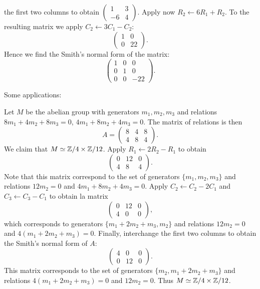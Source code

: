 \begin{example}
the first two columns to obtain 
$\begin{pmatrix}1&3\\-6&4\end{pmatrix}$. Apply now 
$R_2\leftarrow 6R_1+R_2$. To the resulting matrix we apply
$C_2\leftarrow 3C_1-C_2$:
\[
\begin{pmatrix}
    1 & 0\\
    0 & 22
\end{pmatrix}.
\]
Hence we find the Smith's normal form of the matrix: 
\[
\begin{pmatrix}
	1 & 0 & 0\\
	0 & 1 & 0\\
	0 & 0 & -22	
\end{pmatrix}.
\]
\end{example}

Some applications:

\begin{example}
Let $M$ be the abelian group with generators $m_1,m_2,m_3$ and relations 
$8m_1+4m_2+8m_3=0$, $4m_1+8m_2+4m_3=0$. The matrix of relations is then 
\[
A=\begin{pmatrix}
8 & 4 & 8\\
4 & 8 & 4
\end{pmatrix}.
\]	
We claim that $M\simeq\mathbb{Z}/4\times\mathbb{Z}/{12}$. Apply 
$R_1\leftarrow 2R_2-R_1$ to obtain 
\[
\begin{pmatrix}
0 & 12 & 0\\
4 & 8 & 4	
\end{pmatrix}. 
\]
Note that this matrix correspond to the set of generators 
$\{m_1,m_2,m_3\}$ and relations $12m_2=0$ and $4m_1+8m_2+4m_3=0$.
Apply $C_2\leftarrow C_2-2C_1$ and $C_3\leftarrow C_3-C_1$ to obtain 
la matrix
\[
\begin{pmatrix}
0 & 12 & 0\\
4 & 0 & 0	
\end{pmatrix},
\]
which corresponds to generators $\{m_1+2m_2+m_3,m_2\}$ 
and relations $12m_2=0$ and $4(m_1+2m_2+m_3)=0$. 
Finally, interchange the first two columns to obtain
the Smith's normal form of $A$: 
\[
\begin{pmatrix}
4 & 0 & 0\\
0 & 12 & 0	
\end{pmatrix}.
\]
This matrix corresponds to 
the set of generators $\{m_2,m_1+2m_2+m_3\}$ and relations $4(m_1+2m_2+m_3)=0$ and
$12m_2=0$. 
Thus  $M\simeq\mathbb{Z}/4\times\mathbb{Z}/{12}$. 
\end{example}


